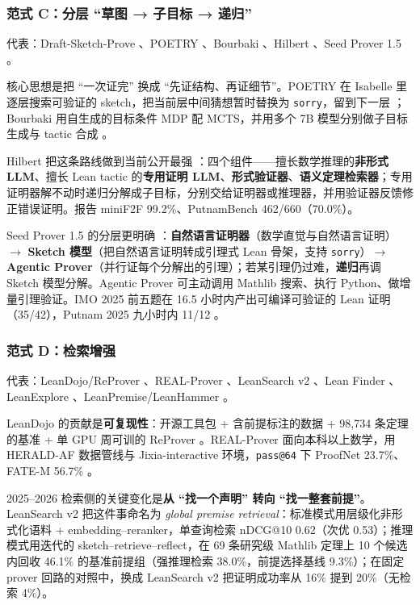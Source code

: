 \documentclass[UTF8,a4paper,11pt,fontset=windows]{ctexart}
\newcommand{\code}[1]{\texttt{#1}}
\begin{document}
\subsubsection{范式 C：分层 ``草图 → 子目标 → 递归''}

代表：Draft-Sketch-Prove \cite{dsp}、POETRY \cite{poetry}、Bourbaki \cite{bourbaki}、Hilbert \cite{hilbert}、Seed Prover 1.5 \cite{seedprover}。

核心思想是把 ``一次证完'' 换成 ``先证结构、再证细节''。POETRY 在 Isabelle 里逐层搜索可验证的 sketch，把当前层中间猜想暂时替换为 \code{sorry}，留到下一层 \cite{poetry}；Bourbaki 用自生成的目标条件 MDP 配 MCTS，并用多个 7B 模型分别做子目标生成与 tactic 合成 \cite{bourbaki}。

Hilbert 把这条路线做到当前公开最强 \cite{hilbert}：四个组件——擅长数学推理的\textbf{非形式 LLM}、擅长 Lean tactic 的\textbf{专用证明 LLM}、\textbf{形式验证器}、\textbf{语义定理检索器}；专用证明器解不动时递归分解成子目标，分别交给证明器或推理器，并用验证器反馈修正错误证明。报告 miniF2F 99.2\%、PutnamBench 462/660（70.0\%）。

Seed Prover 1.5 的分层更明确 \cite{seedprover}：\textbf{自然语言证明器}（数学直觉与自然语言证明）$\rightarrow$ \textbf{Sketch 模型}（把自然语言证明转成引理式 Lean 骨架，支持 \code{sorry}）$\rightarrow$ \textbf{Agentic Prover}（并行证每个分解出的引理）；若某引理仍过难，\textbf{递归}再调 Sketch 模型分解。Agentic Prover 可主动调用 Mathlib 搜索、执行 Python、做增量引理验证。IMO 2025 前五题在 16.5 小时内产出可编译可验证的 Lean 证明（35/42），Putnam 2025 九小时内 11/12 \cite{seedprover}。

\subsubsection{范式 D：检索增强}

代表：LeanDojo/ReProver \cite{leandojo}、REAL-Prover \cite{realprover}、LeanSearch v2 \cite{leansearchv2}、Lean Finder \cite{leanfinder}、LeanExplore \cite{leanexplore}、LeanPremise/LeanHammer \cite{leanhammer}。

LeanDojo 的贡献是\textbf{可复现性}：开源工具包 + 含前提标注的数据 + 98{,}734 条定理的基准 + 单 GPU 周可训的 ReProver \cite{leandojo}。REAL-Prover 面向本科以上数学，用 HERALD-AF 数据管线与 Jixia-interactive 环境，\code{pass@64} 下 ProofNet 23.7\%、FATE-M 56.7\% \cite{realprover}。

2025--2026 检索侧的关键变化是\textbf{从 ``找一个声明'' 转向 ``找一整套前提''}。LeanSearch v2 把这件事命名为 \emph{global premise retrieval}：标准模式用层级化非形式化语料 + embedding--reranker，单查询检索 nDCG@10 0.62（次优 0.53）；推理模式用迭代的 sketch--retrieve--reflect，在 69 条研究级 Mathlib 定理上 10 个候选内回收 46.1\% 的基准前提组（强推理检索 38.0\%，前提选择基线 9.3\%）；在固定 prover 回路的对照中，换成 LeanSearch v2 把证明成功率从 16\% 提到 20\%（无检索 4\%）\cite{leansearchv2}。
\end{document}
